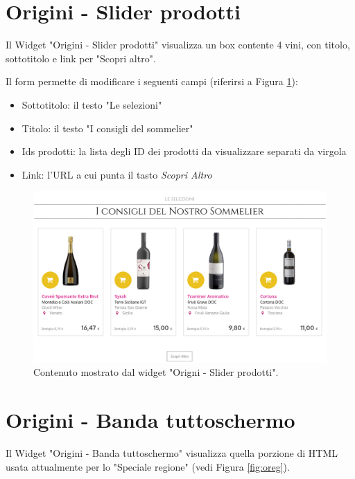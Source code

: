 


\newpage


\section{Origini - Slider prodotti}
Il Widget "Origini - Slider prodotti" visualizza un box contente
4 vini, con titolo, sottotitolo e link per "Scopri altro".

Il form permette di modificare i seguenti campi (riferirsi a Figura \ref{fig:oprod}):
\begin{itemize}
\item Sottotitolo: il testo "Le selezioni"
\item Titolo: il testo "I consigli del sommelier"
\item Ids prodotti: la lista degli ID dei prodotti da visualizzare separati da virgola
\item Link: l'URL a cui punta il tasto \emph{Scopri Altro}
\end{itemize}

\begin{figure}
  \includegraphics[width=\textwidth]{figure/oprod.png}
  \caption{Contenuto mostrato dal widget "Origni - Slider prodotti".}
  \label{fig:oprod}
\end{figure}


\newpage
\section{Origini - Banda tuttoschermo}
Il Widget "Origini - Banda tuttoschermo" visualizza quella porzione di HTML
usata attualmente per lo "Speciale regione" (vedi Figura \ref{fig:oreg}).


